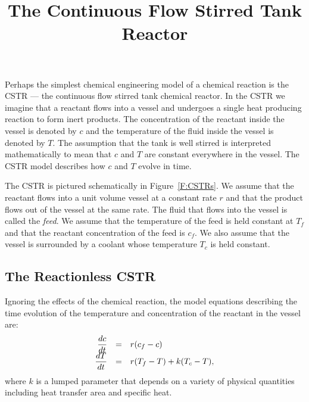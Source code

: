 \documentclass{ximera}
\title{The Continuous Flow Stirred Tank Reactor}
\begin{document}
\begin{abstract}
\end{abstract}
\maketitle

 
\label{S:CSTR} 

Perhaps the simplest chemical engineering model of a chemical
reaction is the CSTR --- the continuous flow stirred tank
chemical reactor.  In the CSTR we imagine that a reactant flows
into a vessel and undergoes a single heat producing reaction to
form inert products.  The concentration of the reactant inside
the vessel is denoted by $c$ and the temperature of the fluid
inside the vessel is denoted by $T$.  The assumption that the
tank is well stirred is interpreted mathematically to mean that
$c$ and $T$ are constant everywhere in the vessel.  The CSTR
model describes how $c$ and $T$ evolve in time. 

The CSTR is pictured schematically in Figure~\ref{F:CSTRs}.  We assume 
that the reactant flows into a unit volume vessel at a constant rate 
$r$ and that the product flows out of the vessel at the same rate.  
The fluid that flows into the vessel is called the {\em feed\/}.  
We assume that the temperature of the feed is held constant at
$T_f$ and that the reactant concentration of the feed is $c_f$.
We also assume that the vessel is surrounded by a coolant whose
temperature $T_c$ is held constant.  

\begin{figure*}[htb]
           \centerline{%
	   }
           \caption{Schematic diagram for CSTR.}
           \label{F:CSTRs}
\end{figure*}


\subsection*{The Reactionless CSTR}

Ignoring the effects of the chemical reaction, the model
equations describing the time evolution of the temperature and
concentration of the reactant in the vessel are:
\arraystart
\begin{equation} \label{e:CSTRlin}
\begin{array}{rcl}
\displaystyle\frac{dc}{dt} & = & r(c_f-c) \\
\displaystyle\frac{dT}{dt} & = & r(T_f-T) + k(T_c-T),
\end{array}
\end{equation}
\arrayfinish   {} 
where $k$ is a lumped parameter that depends on a variety of
physical quantities including heat transfer area and specific
heat.  
\end{document}
